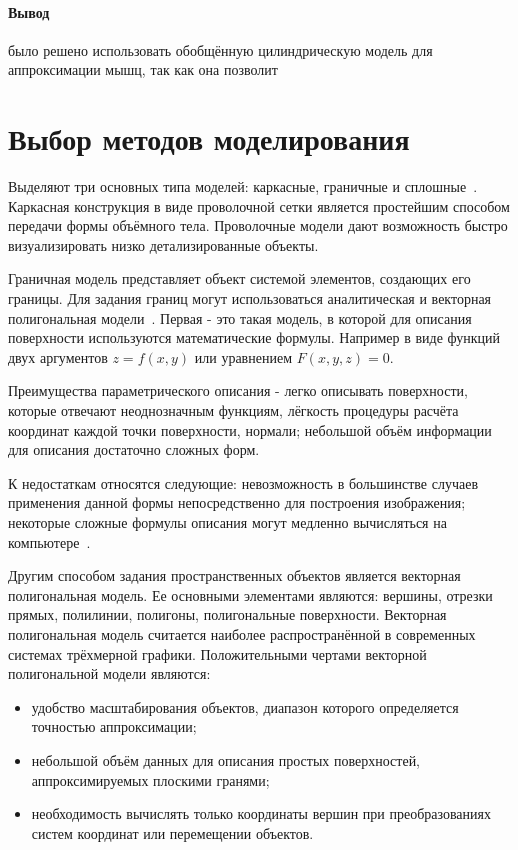 \paragraph{Вывод} было решено использовать обобщённую цилиндрическую модель для аппроксимации мышц, так как она позволит 

\section{Выбор методов моделирования}
\label{sec:model_meth}
Выделяют три основных типа моделей: каркасные, граничные и сплошные~\cite{nikulin}. Каркасная конструкция в виде проволочной сетки является простейшим способом передачи формы объёмного тела. Проволочные модели дают возможность быстро визуализировать низко детализированные объекты.
\par Граничная модель представляет объект системой элементов, создающих его границы. Для задания границ могут использоваться аналитическая и векторная полигональная модели~\cite{porev}. Первая - это такая модель, в которой для описания поверхности используются математические формулы. Например в виде функций двух аргументов $ z = f(x, y)$ или уравнением $F(x, y, z) = 0$.
\par Преимущества параметрического описания - легко описывать поверхности, которые отвечают неоднозначным функциям, лёгкость процедуры расчёта координат каждой точки поверхности, нормали; небольшой объём информации для описания достаточно сложных форм.
\par К недостаткам относятся следующие: невозможность в большинстве случаев применения данной формы непосредственно для построения изображения; некоторые сложные формулы описания могут медленно вычисляться на компьютере~\cite{porev}.
\par Другим способом задания пространственных объектов является векторная полигональная модель. Ее основными элементами являются: вершины, отрезки прямых, полилинии, полигоны, полигональные поверхности. Векторная полигональная модель считается наиболее распространённой в современных системах трёхмерной графики. Положительными чертами векторной полигональной модели являются:
\begin{itemize}
	\item удобство масштабирования объектов, диапазон которого определяется точностью аппроксимации;
	\item небольшой объём данных для описания простых поверхностей, аппроксимируемых плоскими гранями;
	\item необходимость вычислять только координаты вершин при преобразованиях систем координат или перемещении объектов.
\end{itemize}
